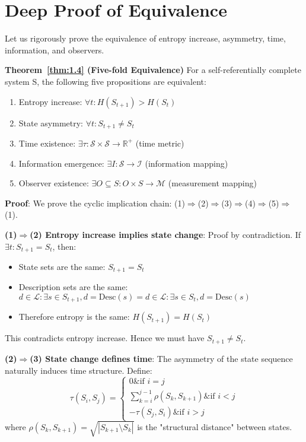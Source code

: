 \section{Deep Proof of Equivalence}
\label{sec:ch03_derivation:deep-proof-of-equivalence}

Let us rigorously prove the equivalence of entropy increase, asymmetry, time, information, and observers.

\textbf{Theorem~\ref{thm:1.4} (Five-fold Equivalence)}
\label{thm:1.4}
For a self-referentially complete system S, the following five propositions are equivalent:
\begin{enumerate}
\item Entropy increase: $\forall t: H(S_{t+1}) > H(S_t)$
\item State asymmetry: $\forall t: S_{t+1} \neq S_t$  
\item Time existence: $\exists \tau: \mathcal{S} \times \mathcal{S} \to \mathbb{R}^+$ (time metric)
\item Information emergence: $\exists I: \mathcal{S} \to \mathcal{I}$ (information mapping)
\item Observer existence: $\exists O \subseteq S: O \times S \to \mathcal{M}$ (measurement mapping)
\end{enumerate}

\textbf{Proof}:
We prove the cyclic implication chain: (1)$\Rightarrow$(2)$\Rightarrow$(3)$\Rightarrow$(4)$\Rightarrow$(5)$\Rightarrow$(1).

\textbf{(1)$\Rightarrow$(2) Entropy increase implies state change}:
Proof by contradiction. If $\exists t: S_{t+1} = S_t$, then:
\begin{itemize}
\item State sets are the same: $S_{t+1} = S_t$
\item Description sets are the same: ${d \in \mathcal{L}: \exists s \in S_{t+1}, d = \text{Desc}(s)} = {d \in \mathcal{L}: \exists s \in S_t, d = \text{Desc}(s)}$
\item Therefore entropy is the same: $H(S_{t+1}) = H(S_t)$
\end{itemize}
This contradicts entropy increase. Hence we must have $S_{t+1} \neq S_t$.

\textbf{(2)$\Rightarrow$(3) State change defines time}:
The asymmetry of the state sequence naturally induces time structure. Define:
\begin{equation}
\tau(S_i, S_j) = \begin{cases}
0 \& \text{if } i = j \\
\sum_{k=i}^{j-1} \rho(S_k, S_{k+1}) \& \text{if } i < j \\
-\tau(S_j, S_i) \& \text{if } i > j
\end{cases}
\end{equation}
where $\rho(S_k, S_{k+1}) = \sqrt{|S_{k+1} \setminus S_k|}$ is the "structural distance" between states.

